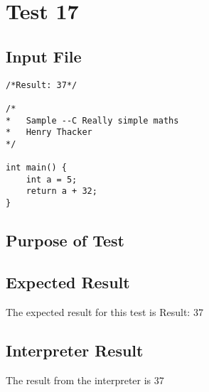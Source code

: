 \section{Test 17}
\subsection{Input File}
\begin{verbatim}
/*Result: 37*/

/*
*	Sample --C Really simple maths 
*	Henry Thacker
*/

int main() {
	int a = 5;
	return a + 32;
}
\end{verbatim}\subsection{Purpose of Test}

\subsection{Expected Result}
The expected result for this test is Result: 37
\subsection{Interpreter Result}
The result from the interpreter is 37

